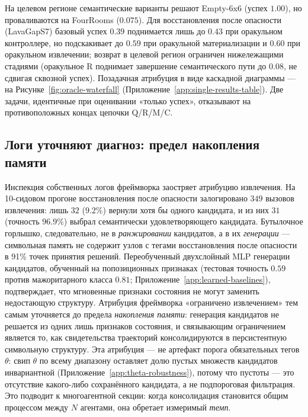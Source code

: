 \documentclass{article}
\begin{document}
На целевом регионе семантические варианты решают Empty-6x6 (успех $1.00$), но проваливаются на FourRooms ($0.075$). Для восстановления после опасности (LavaGapS7) базовый успех $0.39$ поднимается лишь до $0.43$ при оракульном контроллере, но подскакивает до $0.59$ при оракульной материализации и $0.60$ при оракульном извлечении; возврат в целевой регион ограничен нижележащими стадиями (оракульное R поднимает завершение семантического пути до $0.08$, не сдвигая сквозной успех). Позадачная атрибуция в виде каскадной диаграммы --- на Рисунке~\ref{fig:oracle-waterfall} (Приложение~\ref{app:single-results-table}). Две задачи, идентичные при оценивании «только успех», отказывают на противоположных концах цепочки Q/R/M/C.

\subsection{Логи уточняют диагноз: предел накопления памяти}
\label{sec:refined-attribution}

Инспекция собственных логов фреймворка заостряет атрибуцию извлечения. На 10-сидовом прогоне восстановления после опасности залогировано $349$ вызовов извлечения: лишь $32$ ($9.2\%$) вернули хотя бы одного кандидата, и из них $31$ (точность $96.9\%$) выбрал семантически удовлетворяющего кандидата. Бутылочное горлышко, следовательно, не в \emph{ранжировании} кандидатов, а в их \emph{генерации} --- символьная память не содержит узлов с тегами восстановления после опасности в 91\% точек принятия решений. Переобученный двухслойный MLP генерации кандидатов, обученный на попозиционных признаках (тестовая точность $0.59$ против мажоритарного класса $0.81$; Приложение~\ref{app:learned-baselines}), подтверждает, что мгновенные признаки состояния не могут заменить недостающую структуру. Атрибуция фреймворка «ограничено извлечением» тем самым уточняется до предела \emph{накопления памяти}: генерация кандидатов не решается из одних лишь признаков состояния, и связывающим ограничением является то, как свидетельства траекторий консолидируются в персистентную символьную структуру. Эта атрибуция --- не артефакт порога обязательных тегов $\theta$: свип $\theta$ по всему диапазону оставляет долю пустых множеств кандидатов инвариантной (Приложение~\ref{app:theta-robustness}), потому что пустоты --- это отсутствие какого-либо сохранённого кандидата, а не подпороговая фильтрация. Это подводит к многоагентной секции: когда консолидация становится общим процессом между $N$ агентами, она обретает измеримый \emph{темп}.
\end{document}
